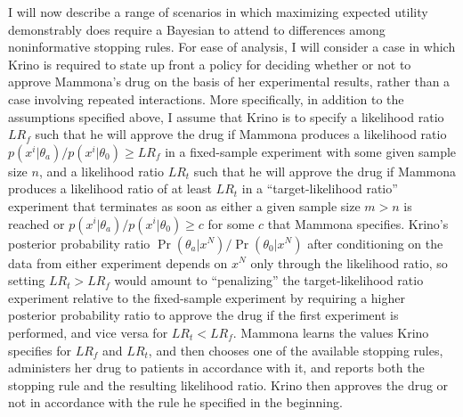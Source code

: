 \documentclass{article}
\theoremstyle{definition}
\begin{document}
I will now describe a range of scenarios in which maximizing expected utility demonstrably does require a Bayesian to attend to differences among noninformative stopping rules.
For ease of analysis, I will consider a case in which Krino is required to state up front a policy for deciding whether or not to approve Mammona's drug on the basis of her experimental results, rather than a case involving repeated interactions.
More specifically, in addition to the assumptions specified above, I assume that Krino is to specify a likelihood ratio $LR_f$ such that he will approve the drug if Mammona produces a likelihood ratio $p(x^i|\theta_a)/p(x^i|\theta_0)\geq LR_f$ in a fixed-sample experiment with some given sample size $n$, and a likelihood ratio $LR_t$ such that he will approve the drug if Mammona produces a likelihood ratio of at least $LR_t$ in a ``target-likelihood ratio'' experiment that terminates as soon as either a given sample size $m>n$ is reached or $p(x^i|\theta_a)/p(x^i|\theta_0)\geq c$ for some $c$ that Mammona specifies.
Krino's posterior probability ratio $\Pr(\theta_a|x^N)/\Pr(\theta_0|x^N)$ after conditioning on the data from either experiment depends on $x^N$ only through the likelihood ratio, so setting $LR_t>LR_f$ would amount to ``penalizing'' the target-likelihood ratio experiment relative to the fixed-sample experiment by requiring a higher posterior probability ratio to approve the drug if the first experiment is performed, and vice versa for $LR_t<LR_f$.
Mammona learns the values Krino specifies for $LR_f$ and $LR_t$, and then chooses one of the available stopping rules, administers her drug to patients in accordance with it, and reports both the stopping rule and the resulting likelihood ratio.
Krino then approves the drug or not in accordance with the rule he specified in the beginning.%
\end{document}
